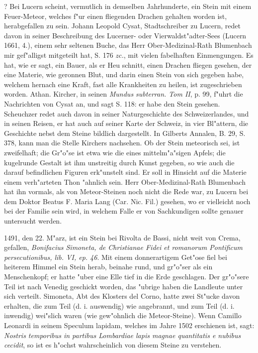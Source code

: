 \documentclass[a4paper, 11pt, oneside, polutonikogreek, german]{article}
\begin{document}
? Bei Lucern scheint, vermutlich in demselben Jahrhunderte, ein Stein mit einem Feuer-Meteor, welches f"ur einen fliegenden Drachen gehalten worden ist, herabgefallen zu sein. Johann Leopold Cysat, Stadtschreiber zu Lucern, redet davon in seiner Beschreibung des Lucerner- oder Vierwaldst"adter-Sees (Lucern 1661, 4.), einem sehr seltenen Buche, das Herr Ober-Medizinal-Rath Blumenbach mir gef"alligst mitgeteilt hat, S. 176 \emph{zc.}, mit vielen fabelhaften Einmengungen. Es hat, wie er sagt, ein Bauer, als er Heu schnitt, einen Drachen fliegen gesehen, der eine Materie, wie geronnen Blut, und darin einen Stein von sich gegeben habe, welchem hernach eine Kraft, fast alle Krankheiten zu heilen, ist zugeschrieben worden. Athan. Kircher, in seinen \emph{Mundus subterran. Tom II}, p. 99, f"uhrt die Nachrichten von Cysat an, und sagt S. 118: er habe den Stein gesehen. Scheuchzer redet auch davon in seiner Naturgeschichte des Schweizerlandes, und in seinen Reisen, er hat auch auf seiner Karte der Schweiz, in vier Bl"attern, die Geschichte nebst dem Steine bildlich dargestellt. In Gilberts Annalen, B. 29, S. 378, kann man die Stelle Kirchers nachsehen. Ob der Stein meteorisch sei, ist zweifelhaft; die Gr"o"se ist etwa wie die eines mittelm"a"sigen Apfels; die kugelrunde Gestalt ist ihm unstreitig durch Kunst gegeben, so wie auch die darauf befindlichen Figuren erk"unstelt sind. Er soll in Hinsicht auf die Materie einem verh"arteten Thon "ahnlich sein. Herr Ober-Medizinal-Rath Blumenbach hat ihn vormals, als von Meteor-Steinen noch nicht die Rede war, zu Lucern bei dem Doktor Beatus F. Maria Lang (Car. Nic. Fil.) gesehen, wo er vielleicht noch bei der Familie sein wird, in welchem Falle er von Sachkundigen sollte genauer untersucht werden.

1491, den 22. M"arz, ist ein Stein bei Rivolta de Bassi, nicht weit von Crema, gefallen, \emph{Bonifacius Simoneta, de Christianae Fidei et romanorum Pontificum persecutionibus, lib. VI, ep. 46}. Mit einem donnerartigem Get"ose fiel bei heiterem Himmel ein Stein herab, beinahe rund, und gr"o"ser als ein Menschenkopf; er hatte "uber eine Elle tief in die Erde geschlagen. Der gr"o"sere Teil ist nach Venedig geschickt worden, das "ubrige haben die Landleute unter sich verteilt. Simoneta, Abt des Klosters del Corno, hatte zwei St"ucke davon erhalten, die zum Teil (d. i. auswendig) wie angebrannt, und zum Teil (d. i. inwendig) wei"slich waren (wie gew"ohnlich die Meteor-Steine). Wenn Camillo Leonardi in seinem Speculum lapidam, welches im Jahre 1502 erschienen ist, sagt: \emph{Nostris temporibus in partibus Lombardiae lapis magnae quantitatis e nubibus cecidit}, so ist es h"ochst wahrscheinlich von diesem Steine zu verstehen.
\end{document}
